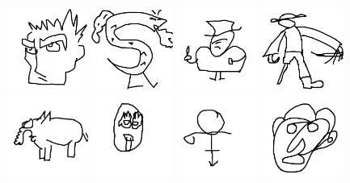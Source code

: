 \includegraphics[width=0.2\textwidth]{art/Safari_23.png}
\includegraphics[width=0.2\textwidth]{art/Safari_24.png}
\includegraphics[width=0.2\textwidth]{art/Safari_25.png}
\includegraphics[width=0.2\textwidth]{art/Safari_26.png}
\includegraphics[width=0.2\textwidth]{art/Safari_27.png}
\includegraphics[width=0.2\textwidth]{art/Safari_28.png}
\includegraphics[width=0.2\textwidth]{art/Safari_29.png}
\includegraphics[width=0.2\textwidth]{art/Safari_3.png}
